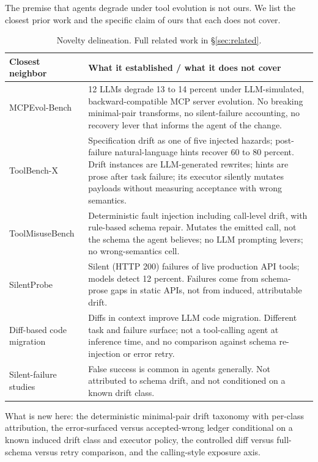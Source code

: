 The premise that agents degrade under tool evolution is not ours. We list the closest prior work and the specific claim of ours that each does not cover.

\begin{table}[h]
\small
\centering
\begin{tabular}{p{4.6cm}p{8.6cm}}
\toprule
\textbf{Closest neighbor} & \textbf{What it established / what it does not cover} \\
\midrule
MCPEvol-Bench \citep{mcpevol} & 12 LLMs degrade 13 to 14 percent under LLM-simulated, backward-compatible MCP server evolution. No breaking minimal-pair transforms, no silent-failure accounting, no recovery lever that informs the agent of the change. \\
ToolBench-X \citep{toolbenchx} & Specification drift as one of five injected hazards; post-failure natural-language hints recover 60 to 80 percent. Drift instances are LLM-generated rewrites; hints are prose after task failure; its executor silently mutates payloads without measuring acceptance with wrong semantics. \\
ToolMisuseBench \citep{toolmisuse} & Deterministic fault injection including call-level drift, with rule-based schema repair. Mutates the emitted call, not the schema the agent believes; no LLM prompting levers; no wrong-semantics cell. \\
SilentProbe \citep{silentprobe} & Silent (HTTP 200) failures of live production API tools; models detect 12 percent. Failures come from schema-prose gaps in static APIs, not from induced, attributable drift. \\
Diff-based code migration \citep{whatadiff, deprepair, recode} & Diffs in context improve LLM code migration. Different task and failure surface; not a tool-calling agent at inference time, and no comparison against schema re-injection or error retry. \\
Silent-failure studies \citep{falsesuccess, errnarratives, reflecterr} & False success is common in agents generally. Not attributed to schema drift, and not conditioned on a known drift class. \\
\bottomrule
\end{tabular}
\caption{Novelty delineation. Full related work in \S\ref{sec:related}.}
\label{tab:delineation}
\end{table}

What is new here: the deterministic minimal-pair drift taxonomy with per-class attribution, the error-surfaced versus accepted-wrong ledger conditional on a known induced drift class and executor policy, the controlled diff versus full-schema versus retry comparison, and the calling-style exposure axis.

